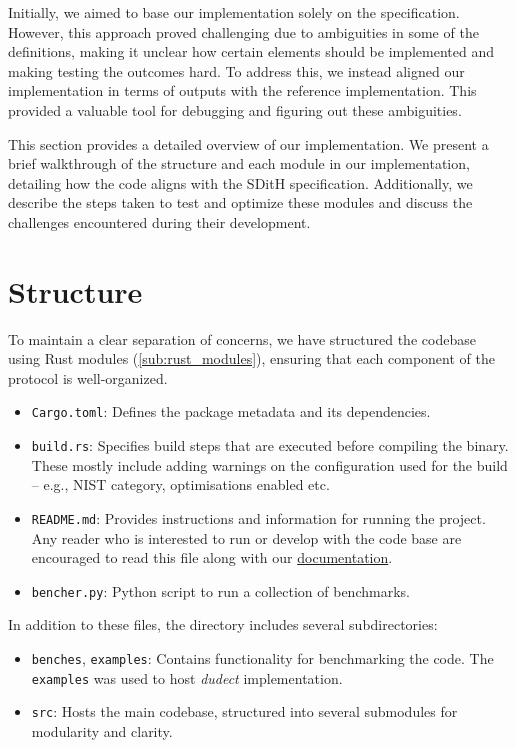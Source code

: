 \documentclass[11pt]{report}
\theoremstyle{definition}
\theoremstyle{plain}
\begin{document}
Initially, we aimed to base our implementation solely on the specification. However, this approach proved challenging due to ambiguities in some of the definitions, making it unclear how certain elements should be implemented and making testing the outcomes hard. To address this, we instead aligned our implementation in terms of outputs with the reference implementation. This provided a valuable tool for debugging and figuring out these ambiguities.

This section provides a detailed overview of our implementation. We present a brief walkthrough of the structure and each module in our implementation, detailing how the code aligns with the SDitH specification. Additionally, we describe the steps taken to test and optimize these modules and discuss the challenges encountered during their development.

\section{Structure}
To maintain a clear separation of concerns, we have structured the codebase using Rust modules (\autoref{sub:rust_modules}), ensuring that each component of the protocol is well-organized.

\begin{itemize}[itemsep=2pt, parsep=0pt]
  \item \texttt{Cargo.toml}: Defines the package metadata and its dependencies.
  \item \texttt{build.rs}: Specifies build steps that are executed before compiling the binary. These mostly include adding warnings on the configuration used for the build -- e.g., NIST category, optimisations enabled etc.
  \item \texttt{README.md}: Provides instructions and information for running the project. Any reader who is interested to run or develop with the code base are encouraged to read this file along with our \href{https://mactherobot.github.io/sdith-rust}{documentation}.
  \item \texttt{bencher.py}: Python script to run a collection of benchmarks.
\end{itemize}

In addition to these files, the directory includes several subdirectories:

\begin{itemize}[itemsep=2pt, parsep=0pt]
  \item \texttt{benches}, \texttt{examples}: Contains functionality for benchmarking the code. The \texttt{examples} was used to host \textit{dudect} implementation.
  \item \texttt{src}: Hosts the main codebase, structured into several submodules for modularity and clarity.
\end{itemize}
\end{document}

